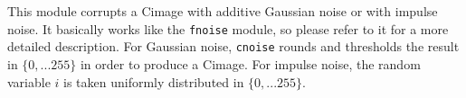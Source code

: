 This module corrupts a Cimage with additive Gaussian noise
or with impulse noise. It basically works like the \verb+fnoise+ 
module, so please refer to it for a more detailed description. 
For Gaussian noise, \verb+cnoise+
rounds and thresholds the result in $\{0,...255\}$ in order to produce 
a Cimage. For impulse noise, the random variable $i$ 
is taken uniformly distributed in $\{0,...255\}$.
